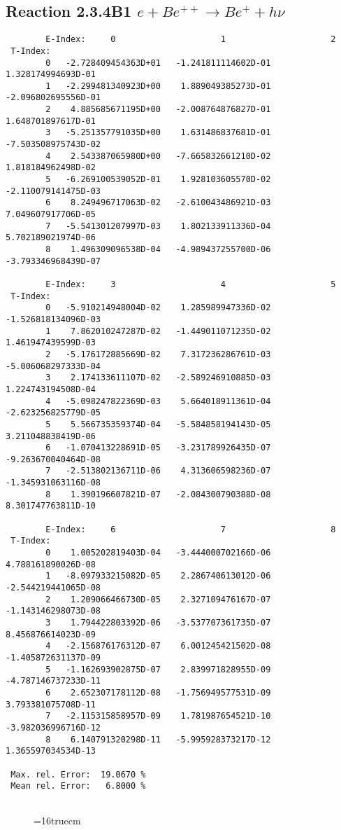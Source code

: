 \documentclass[12pt]{article}
\begin{document}
\subsection{
Reaction 2.3.4B1  $e + Be^{++} \rightarrow Be^+ + h\nu$
}

\begin{small}\begin{verbatim}
        E-Index:     0                     1                     2
 T-Index:
        0   -2.728409454363D+01   -1.241811114602D-01    1.328174994693D-01
        1   -2.299481340923D+00    1.889049385273D-01   -2.096802695556D-01
        2    4.885685671195D+00   -2.008764876827D-01    1.648701897617D-01
        3   -5.251357791035D+00    1.631486837681D-01   -7.503508975743D-02
        4    2.543387065980D+00   -7.665832661210D-02    1.818184962498D-02
        5   -6.269100539052D-01    1.928103605570D-02   -2.110079141475D-03
        6    8.249496717063D-02   -2.610043486921D-03    7.049607917706D-05
        7   -5.541301207997D-03    1.802133911336D-04    5.702189021974D-06
        8    1.496309096538D-04   -4.989437255700D-06   -3.793346968439D-07

        E-Index:     3                     4                     5
 T-Index:
        0   -5.910214948004D-02    1.285989947336D-02   -1.526818134096D-03
        1    7.862010247287D-02   -1.449011071235D-02    1.461947439599D-03
        2   -5.176172885669D-02    7.317236286761D-03   -5.006068297333D-04
        3    2.174133611107D-02   -2.589246910885D-03    1.224743194508D-04
        4   -5.098247822369D-03    5.664018911361D-04   -2.623256825779D-05
        5    5.566735359374D-04   -5.584858194143D-05    3.211048838419D-06
        6   -1.070413228691D-05   -3.231789926435D-07   -9.263670040464D-08
        7   -2.513802136711D-06    4.313606598236D-07   -1.345931063116D-08
        8    1.390196607821D-07   -2.084300790388D-08    8.301747763811D-10

        E-Index:     6                     7                     8
 T-Index:
        0    1.005202819403D-04   -3.444000702166D-06    4.788161890026D-08
        1   -8.097933215082D-05    2.286740613012D-06   -2.544219441065D-08
        2    1.209066466730D-05    2.327109476167D-07   -1.143146298073D-08
        3    1.794422803392D-06   -3.537707361735D-07    8.456876614023D-09
        4   -2.156876176312D-07    6.001245421502D-08   -1.405872631137D-09
        5   -1.162693902875D-07    2.839971828955D-09   -4.787146737233D-11
        6    2.652307178112D-08   -1.756949577531D-09    3.793381075708D-11
        7   -2.115315858957D-09    1.781987654521D-10   -3.982036996716D-12
        8    6.140791320298D-11   -5.995928373217D-12    1.365597034534D-13

 Max. rel. Error:  19.0670 %
 Mean rel. Error:   6.8000 %


\end{verbatim}\end{small}
\begin{figure} \label{2.3.4B1}
\epsfxsize=16truecm
\end{figure}
\newpage
\end{document}
